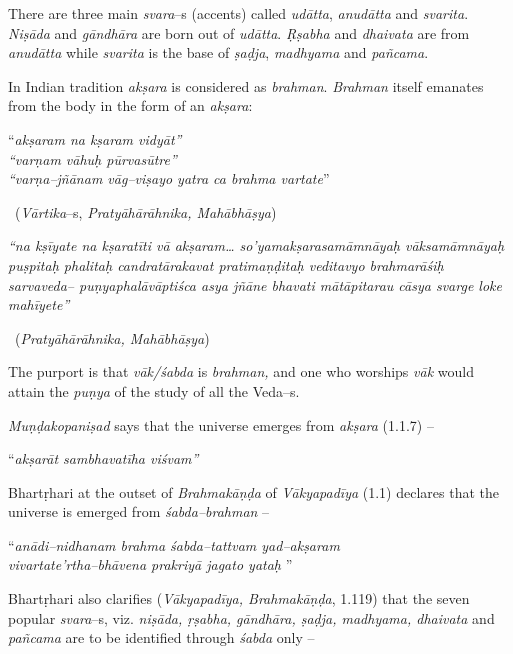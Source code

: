 There are three main \textit{svara}–s (accents) called \textit{udātta}, \textit{anudātta} and \textit{svarita}. \textit{Niṣāda} and \textit{gāndhāra} are born out of \textit{udātta}. \textit{Ṛṣabha} and \textit{dhaivata} are from \textit{anudātta} while \textit{svarita} is the base of \textit{ṣaḍja}, \textit{madhyama} and \textit{pañcama}.

In Indian tradition \textit{akṣara} is considered as \textit{brahman}. \textit{Brahman} itself emanates from the body in the form of an \textit{akṣara}:

\begin{myquote}
“\textit{akṣaram na kṣaram vidyāt”}\\\textit{“varṇam vāhuḥ pūrvasūtre”}\\\textit{“varṇa–jñānam vāg–viṣayo yatra ca brahma vartate}” 

~\hfill (\textit{Vārtika}–s, \textit{Pratyāhārāhnika, Mahābhāṣya})
\end{myquote}

\begin{myquote}
\textit{“na kṣīyate na kṣaratīti vā akṣaram… so’yamakṣarasamāmnāyaḥ vāksamāmnāyaḥ puṣpitaḥ phalitaḥ candratārakavat pratimaṇḍitaḥ veditavyo brahmarāśiḥ sarvaveda– puṇyaphalāvāptiśca asya jñāne bhavati mātāpitarau cāsya svarge loke mahīyete”} 

~\hfill (\textit{Pratyāhārāhnika, Mahābhāṣya})
\end{myquote}

The purport is that \textit{vāk/śabda} is \textit{brahman,} and one who worships \textit{vāk} would attain the \textit{puṇya} of the study of all the Veda–s.

\textit{Muṇḍakopaniṣad} says that the universe emerges from \textit{akṣara} (1.1.7) –

\begin{myquote}
“\textit{akṣarāt sambhavatīha viśvam”}
\end{myquote}

Bhartṛhari at the outset of \textit{Brahmakāṇḍa} of \textit{Vākyapadīya} (1.1) declares that the universe is emerged from \textit{śabda–brahman} –

\begin{myquote}
“\textit{anādi–nidhanam brahma śabda–tattvam yad–akṣaram }\\\textit{vivartate’rtha–bhāvena prakriyā jagato yataḥ} ”
\end{myquote}

Bhartṛhari also clarifies (\textit{Vākyapadīya, Brahmakāṇḍa}, 1.119) that the seven popular \textit{svara}–s, viz. \textit{niṣāda, ṛṣabha, gāndhāra, ṣaḍja, madhyama, dhaivata} and \textit{pañcama} are to be identified through \textit{śabda} only –

